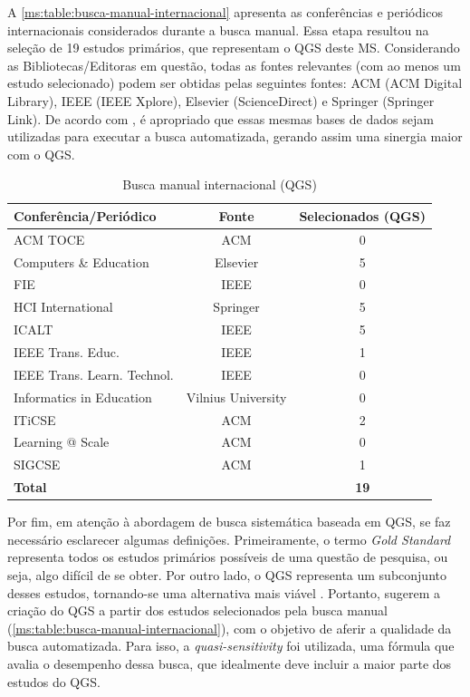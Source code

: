 A \autoref{ms:table:busca-manual-internacional} apresenta as conferências e periódicos internacionais considerados durante a busca manual. Essa etapa resultou na seleção de 19 estudos primários, que representam o QGS deste MS. Considerando as Bibliotecas/Editoras em questão, todas as fontes relevantes (com ao menos um estudo selecionado) podem ser obtidas pelas seguintes fontes: ACM (ACM Digital Library), IEEE (IEEE Xplore), Elsevier (ScienceDirect) e Springer (Springer Link). De acordo com , é apropriado que essas mesmas bases de dados sejam utilizadas para executar a busca automatizada, gerando assim uma sinergia maior com o QGS.

\begin{table}[htbp]
\centering
\caption{Busca manual internacional (QGS)}
\label{ms:table:busca-manual-internacional}
\begin{tabular}{lcc}
\hline
\textbf{Conferência/Periódico} & \textbf{Fonte}     & \textbf{Selecionados (QGS)} \\ \hline
ACM TOCE                       & ACM                & 0            \\ 
Computers \& Education         & Elsevier           & 5            \\ 
FIE                            & IEEE               & 0            \\ 
HCI International              & Springer           & 5            \\ 
ICALT                          & IEEE               & 5            \\ 
IEEE Trans. Educ.              & IEEE               & 1            \\ 
IEEE Trans. Learn. Technol.    & IEEE               & 0            \\ 
Informatics in Education       & Vilnius University & 0            \\ 
ITiCSE                         & ACM                & 2            \\ 
Learning @ Scale               & ACM                & 0            \\ 
SIGCSE                         & ACM                & 1            \\ 
\textbf{Total}                 & \textbf{}          & \textbf{19}  \\ \hline
\end{tabular}
\fautor
\end{table}

Por fim, em atenção à abordagem de busca sistemática baseada em QGS, se faz necessário esclarecer algumas definições. Primeiramente, o termo \textit{Gold Standard} representa todos os estudos primários possíveis de uma questão de pesquisa, ou seja, algo difícil de se obter. Por outro lado, o QGS representa um subconjunto desses estudos, tornando-se uma alternativa mais viável \cite{Zhang2011}. Portanto,  sugerem a criação do QGS a partir dos estudos selecionados pela busca manual (\autoref{ms:table:busca-manual-internacional}), com o objetivo de aferir a qualidade da busca automatizada. Para isso, a \textit{quasi-sensitivity} foi utilizada, uma fórmula que avalia o desempenho dessa busca, que idealmente deve incluir a maior parte dos estudos do QGS. 

